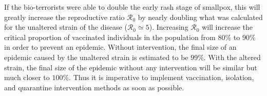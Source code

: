If the bio-terrorists were able to double the early rash stage of smallpox, this will greatly increase the reproductive ratio $\mathcal R_0$ by nearly doubling what was calculated for the unaltered strain of the disease ($\mathcal R_0 \simeq 5$). Increasing $\mathcal R_0$ will increase the critical proportion of vaccinated individuals in the population from $80\%$ to $90\%$ in order to prevent an epidemic. Without intervention, the final size of an  epidemic caused by the unaltered strain is estimated to be $99\%$. 	With the altered strain, the final size of the epidemic without any intervention will be similar but much closer to $100\%$. Thus it is imperative to implement vaccination, isolation, and quarantine intervention methods as soon as possible.
